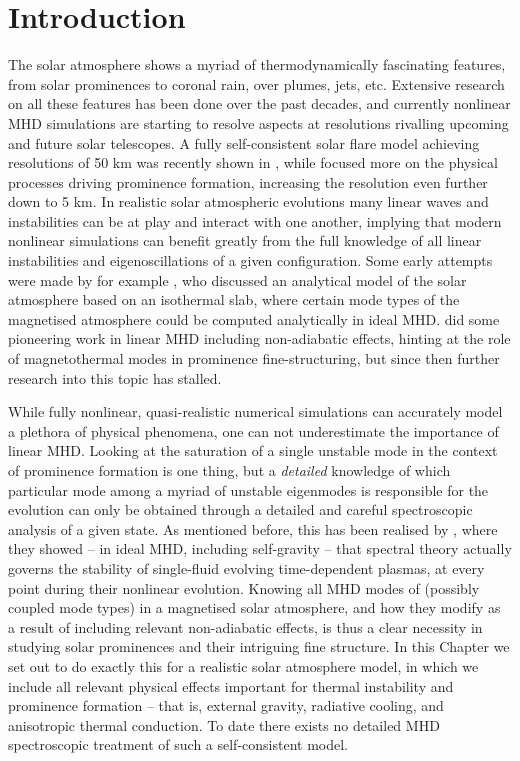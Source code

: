 \section{Introduction}
The solar atmosphere shows a myriad of thermodynamically fascinating features, from solar prominences to coronal rain, over plumes, jets, etc. Extensive research on all these features has been done over the past decades, and currently nonlinear MHD simulations are starting to resolve aspects at resolutions rivalling upcoming and future solar telescopes.
A fully self-consistent solar flare model achieving resolutions of 50 km was recently shown in \citet{ruan2020}, while \citet{jenkins2021} focused more on the physical processes driving prominence formation, increasing the resolution even further down to 5 km. In realistic solar atmospheric evolutions many linear waves and instabilities can be at play and interact with one another, implying that modern nonlinear simulations can benefit greatly from the full knowledge of all linear instabilities and eigenoscillations of a given configuration. Some early attempts were made by for example \citet{nye1976}, who discussed an analytical model of the solar atmosphere based on an isothermal slab, where certain mode types of the magnetised atmosphere could be computed analytically in ideal MHD. \citet{vanderlinden1991} did some pioneering work in linear MHD including non-adiabatic effects, hinting at the role of magnetothermal modes in prominence fine-structuring, but since then further research into this topic has stalled.

While fully nonlinear, quasi-realistic numerical simulations can accurately model a plethora of physical phenomena, one can not underestimate the importance of linear MHD. Looking at the saturation of a single unstable mode in the context of prominence formation is one thing, but a \emph{detailed} knowledge of which particular mode among a myriad of unstable eigenmodes is responsible for the evolution can only be obtained through a detailed and careful spectroscopic analysis of a given state. As mentioned before, this has been realised by \citet{demaerel2016}, where they showed -- in ideal MHD, including self-gravity -- that spectral theory actually governs the stability of single-fluid evolving time-dependent plasmas, at every point during their nonlinear evolution. Knowing all MHD modes of (possibly coupled mode types) in a magnetised solar atmosphere, and how they modify as a result of including relevant non-adiabatic effects, is thus a clear necessity in studying solar prominences and their intriguing fine structure. In this Chapter we set out to do exactly this for a realistic solar atmosphere model, in which we include all relevant physical effects important for thermal instability and prominence formation -- that is, external gravity, radiative cooling, and anisotropic thermal conduction. To date there exists no detailed MHD spectroscopic treatment of such a self-consistent model.

